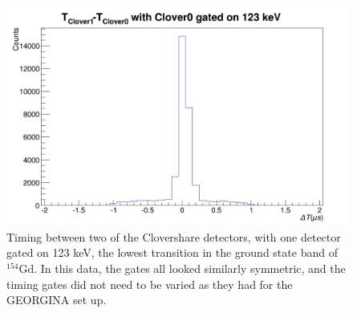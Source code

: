 \begin{figure}
    \centering
    \includegraphics[scale=0.3]{Analysis_Figs/timing_clover.png}
    \caption{Timing between two of the Clovershare detectors, with one detector gated on 123 keV, the lowest transition in the ground state band of $^{154}$Gd. In this data, the gates all looked similarly symmetric, and the timing gates did not need to be varied as they had for the GEORGINA set up.}
    \label{fig:timing_clover}
\end{figure}